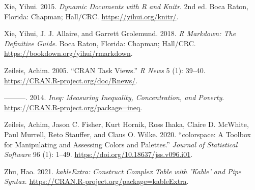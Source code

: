 \documentclass{article}
\newlength{\cslhangindent}
\newlength{\cslentryspacingunit} %
\newenvironment{CSLReferences}[2] %
 {%
  \setlength{\parindent}{0pt}
  \ifodd #1
  \let\oldpar\par
  \def\par{\hangindent=\cslhangindent\oldpar}
  \fi
  \setlength{\parskip}{#2\cslentryspacingunit}
 }%
 {}
\begin{document}
\begin{CSLReferences}{1}{0}
\leavevmode{}%
Xie, Yihui. 2015. \emph{Dynamic Documents with {R} and Knitr}. 2nd ed.
Boca Raton, Florida: Chapman; Hall/CRC. \url{https://yihui.org/knitr/}.

\leavevmode{}%
Xie, Yihui, J. J. Allaire, and Garrett Grolemund. 2018. \emph{R
Markdown: The Definitive Guide}. Boca Raton, Florida: Chapman; Hall/CRC.
\url{https://bookdown.org/yihui/rmarkdown}.

\leavevmode{}%
Zeileis, Achim. 2005. {``{CRAN} Task Views.''} \emph{R News} 5 (1):
39--40. \url{https://CRAN.R-project.org/doc/Rnews/}.

\leavevmode{}%
---------. 2014. \emph{Ineq: Measuring Inequality, Concentration, and
Poverty}. \url{https://CRAN.R-project.org/package=ineq}.

\leavevmode{}%
Zeileis, Achim, Jason C. Fisher, Kurt Hornik, Ross Ihaka, Claire D.
McWhite, Paul Murrell, Reto Stauffer, and Claus O. Wilke. 2020.
{``{colorspace}: A Toolbox for Manipulating and Assessing Colors and
Palettes.''} \emph{Journal of Statistical Software} 96 (1): 1--49.
\url{https://doi.org/10.18637/jss.v096.i01}.

\leavevmode{}%
Zhu, Hao. 2021. \emph{kableExtra: Construct Complex Table with 'Kable'
and Pipe Syntax}. \url{https://CRAN.R-project.org/package=kableExtra}.

\end{CSLReferences}



\end{document}
